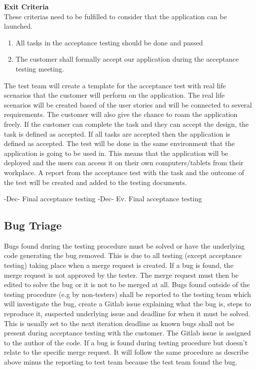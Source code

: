\noindent \textbf{Exit Criteria}\\
These criterias need to be fulfilled to consider that the application can be launched.
\begin{enumerate}
    \item All tasks in the acceptance testing should be done and passed
    \item The customer shall formally accept our application during the acceptance testing meeting.
\end{enumerate}

\noindent The test team will create a template for the acceptance test with real life scenarios that the customer will perform on the application. The real life scenarios will be created based of the user stories and will be connected to several requirements. The customer will also give the chance to roam the application freely. If the customer can complete the task and they can accept the design, the task is defined as accepted. If all tasks are accepted then the application is defined as accepted. The test will be done in the same environment that the application is going to be used in. This means that the application will be deployed and the users can access it on their own computers/tablets from their workplace. A report from the acceptance test with the task and the outcome of the test will be created and added to the testing documents.
\newline


-Dec- Final acceptance testing\newline
{}-Dec- Ev. Final acceptance testing\newline

\subsection{Bug Triage}
Bugs found during the testing procedure must be solved or have the underlying code generating the bug removed. This is due to all testing (except acceptance testing) taking place when a merge request is created. If a bug is found, the merge request is not approved by the tester. The merge request must then be edited to solve the bug or it is not to be merged at all. Bugs found outside of the testing procedure (e.g by non-testers) shall be reported to the testing team which will investigate the bug, create a Gitlab issue explaining what the bug is, steps to reproduce it, suspected underlying issue and deadline for when it must be solved. This is usually set to the next iteration deadline as known bugs shall not be present during acceptance testing with the customer. The Gitlab issue is assigned to the author of the code. If a bug is found during testing procedure but doesn't relate to the specific merge request. It will follow the same procedure as describe above minus the reporting to test team because the test team found the bug. 

